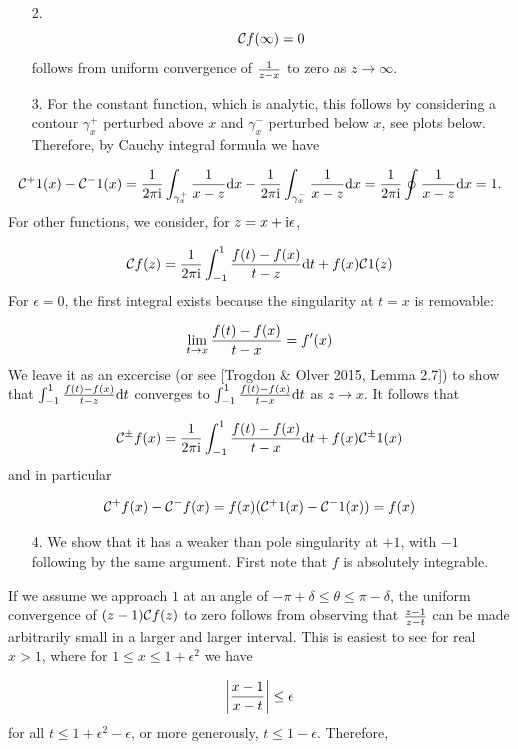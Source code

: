 \documentclass[12pt,a4paper]{article}
\def\D{ {\rm d} }
\def\I{ {\rm i} }
\def\CC{ {\cal C} }
\def\dx{\D x}
\def\dt{\D t}
\begin{document}
\begin{itemize}
\item[2. ] \[
{\cal C} f(\infty) = 0
\]
follows from uniform convergence of $1 \over z - x$ to zero as $z \rightarrow \infty$.


\item[3. ] For the constant function, which is analytic, this follows by considering a contour $\gamma_x^+$ perturbed above $x$ and $\gamma_x^-$ perturbed below $x$, see plots below.  Therefore, by Cauchy integral formula we have

\end{itemize}
\[
\CC^+ 1 (x) - \CC^- 1 (x) = {1 \over 2 \pi \I}\int_{\gamma_x^+} {1 \over x - z} \dx - {1 \over 2 \pi \I}\int_{\gamma_x^-} {1 \over x - z} \dx = {1 \over 2 \pi \I} \oint {1 \over x -z } \dx = 1.
\]
For other functions, we consider, for $z = x + \I \epsilon$,

\[
    {\cal C} f(z) =   {1 \over 2 \pi \I} \int_{-1}^1 {f(t) - f(x) \over t - z} \dt + f(x) \CC 1(z)
\]
For $\epsilon = 0$, the first integral exists because the singularity at $t = x$ is removable: 

\[
\lim_{t \rightarrow x} {f(t) - f(x) \over t - x} = f'(x)
\]
We leave it as an excercise (or see [Trogdon \& Olver 2015, Lemma 2.7]) to show that $\int_{-1}^1 {f(t) - f(x) \over t - z} \dt$ converges to $\int_{-1}^1 {f(t) - f(x) \over t - x} \dt$ as $z \rightarrow x$. It follows that

\[
{\cal C}^\pm f(x) =   {1 \over 2 \pi \I} \int_{-1}^1 {f(t) - f(x) \over t - x} \dt + f(x) \CC^\pm 1(x)
\]
and in particular

\[
{\cal C}^+ f(x) - {\cal C}^- f(x)  =  f(x) (\CC^+ 1(x) - \CC^- 1(x)) = f(x)
\]
\begin{itemize}
\item[4. ] We show that it has a weaker than pole singularity at $+1$, with $-1$ following by the same argument. First note that $f$ is absolutely integrable. 

\end{itemize}
If we assume we approach $1$ at an angle of $-\pi + \delta \leq \theta \leq \pi - \delta$, the uniform convergence of $(z - 1) \CC f(z)$ to zero follows from observing that ${z-1 \over z - t}$ can be made arbitrarily small in a larger and larger interval. This is easiest to see for real $x > 1$, where for  $1 \leq x \leq 1 + \epsilon^2$ we have

\[
\left|{x -1 \over x-t }\right| \leq \epsilon
\]
for all $t \leq 1 + \epsilon^2 - \epsilon$, or more generously, $t \leq 1 - \epsilon$. Therefore,
\end{document}
